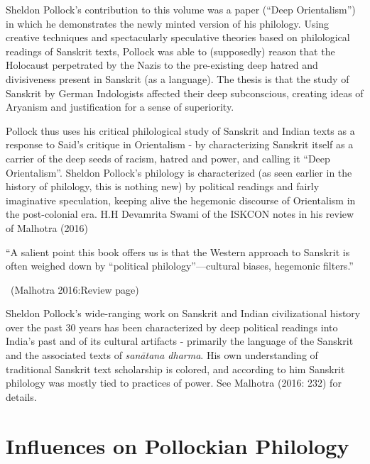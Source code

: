 \vskip 3pt

Sheldon Pollock’s contribution to this volume was a paper (“Deep Orientalism”) in which he demonstrates the newly minted version of his philology. Using creative techniques and spectacularly speculative theories based on philological readings of Sanskrit texts, Pollock was able to (supposedly) reason that the Holocaust perpetrated by the Nazis to the pre-existing deep hatred and divisiveness present in Sanskrit (as a language). The thesis is that the study of Sanskrit by German Indologists affected their deep subconscious, creating ideas of Aryanism and justification for a sense of superiority.

\vskip 3pt

Pollock thus uses his critical philological study of Sanskrit and Indian texts as a response to Said’s critique in Orientalism - by characterizing Sanskrit itself as a carrier of the deep seeds of racism, hatred and power, and calling it “Deep Orientalism”. Sheldon Pollock’s philology is characterized (as seen earlier in the history of philology, this is nothing new) by political readings and fairly imaginative speculation, keeping alive the hegemonic discourse of Orientalism in the post-colonial era. H.H Devamrita Swami of the ISKCON notes in his review of Malhotra (2016)

\vskip 3pt

\begin{myquote}
“A salient point this book offers us is that the Western approach to Sanskrit is often weighed down by “political philology”—cultural biases, hegemonic filters.”

~\hfill (Malhotra 2016:Review page)
\end{myquote}

\vskip 3pt

Sheldon Pollock’s wide-ranging work on Sanskrit and Indian civilizational history over the past 30 years has been characterized by deep political readings into India’s past and of its cultural artifacts - primarily the language of the Sanskrit and the associated texts of \textit{sanātana dharma}. His own understanding of traditional Sanskrit text scholarship is colored, and according to him Sanskrit philology was mostly tied to practices of power. See Malhotra (2016: 232) for details.


\section*{Influences on Pollockian Philology}

